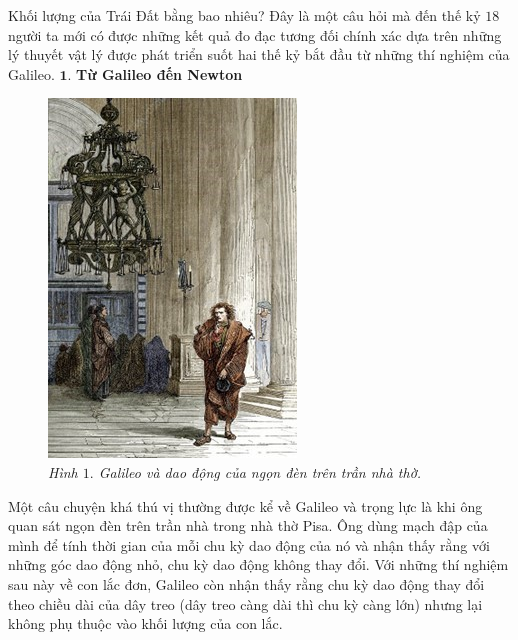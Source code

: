 \begin{multicols}{2}
	Khối lượng của Trái Đất bằng bao nhiêu? Đây là một câu hỏi mà đến thế kỷ $18$ người ta mới có được những kết quả đo đạc tương đối chính xác dựa trên những lý thuyết vật lý được phát triển suốt hai thế kỷ bắt đầu từ những thí nghiệm của Galileo.
	\vskip 0.1cm
	$\pmb{1.}$ \textbf{\color{timhieukhoahoc}Từ Galileo đến Newton}
	\begin{figure}[H]
		\vspace*{-5pt}
		\centering
		\captionsetup{labelformat= empty, justification=centering}
		\includegraphics[width= 0.75\linewidth]{1}
		\caption{\small\textit{\color{timhieukhoahoc}Hình ${1.}$ Galileo và dao động của ngọn đèn trên trần nhà thờ.}}
		\vspace*{-10pt}
	\end{figure}
	Một câu chuyện khá thú vị thường được kể về Galileo và trọng lực là khi ông quan sát ngọn đèn trên trần nhà trong nhà thờ Pisa. Ông dùng mạch đập của mình để tính thời gian của mỗi chu kỳ dao động của nó và nhận thấy rằng với những góc dao động nhỏ, chu kỳ dao động không thay đổi. Với những thí nghiệm sau này về con lắc đơn, Galileo còn nhận thấy rằng chu kỳ dao động thay đổi theo chiều dài của dây treo (dây treo càng dài thì chu kỳ càng lớn) nhưng lại không phụ thuộc vào khối lượng của con lắc.

\end{multicols}
